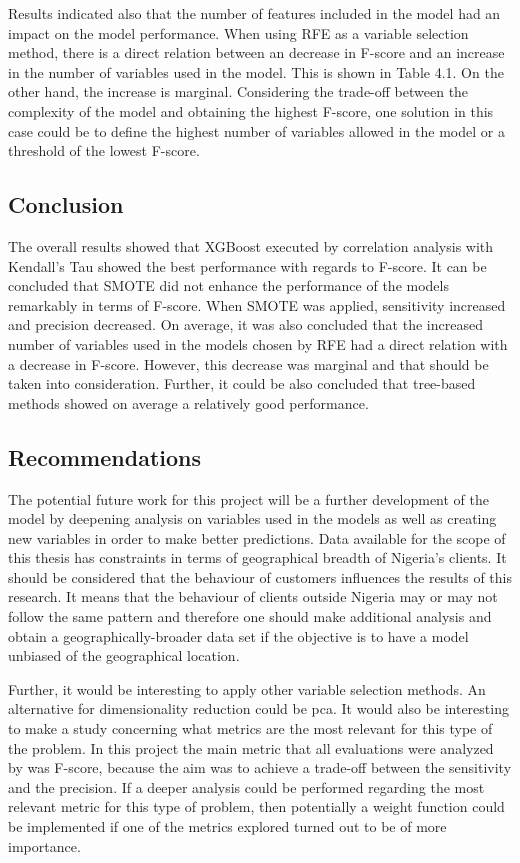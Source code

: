 \documentclass[a4paper]{article}
\begin{document}
Results indicated also that the number of features included in the model had an impact on the model performance. When using RFE as a variable selection method, there is a direct relation between an decrease in F-score and an increase in the number of variables used in the model. This is shown in Table 4.1. On the other hand, the increase is marginal. Considering the trade-off between the complexity of the model and obtaining the highest F-score, one solution in this case could be to define the highest number of variables allowed in the model or a threshold of the lowest F-score.


\subsection{Conclusion}
The overall results showed that XGBoost executed by correlation analysis with Kendall’s Tau showed the best performance with regards to F-score. It can be concluded that SMOTE did not enhance the performance of the models remarkably in terms of F-score. When SMOTE was applied, sensitivity increased and precision decreased. On average, it was also concluded that the increased number of variables used in the models chosen by RFE had a direct relation with a decrease in F-score. However, this decrease was marginal and that should be taken into consideration. Further, it could be also concluded that tree-based methods showed on average a relatively good performance.

\subsection{Recommendations}
The potential future work for this project will be a further development of the model by deepening analysis on variables used in the models as well as creating new variables in order to make better predictions. Data available for the scope of this thesis has constraints in terms of geographical breadth of Nigeria’s clients. It should be considered that the behaviour of customers influences the results of this research. It means that the behaviour of clients outside Nigeria may or may not follow the same pattern and therefore one should make additional analysis and obtain a geographically-broader data set if the objective is to have a model unbiased of the geographical location.

Further, it would be interesting to apply other variable selection methods. An alternative for dimensionality reduction could be \gls{pca}. It would also be interesting to make a study concerning what metrics are the most relevant for this type of the problem. In this project the main metric that all evaluations were analyzed by was F-score, because the aim was to achieve a trade-off between the sensitivity and the precision. If a deeper analysis could be performed regarding the most relevant metric for this type of problem, then potentially a weight function could be implemented if one of the metrics explored turned out to be of more importance.
\end{document}
